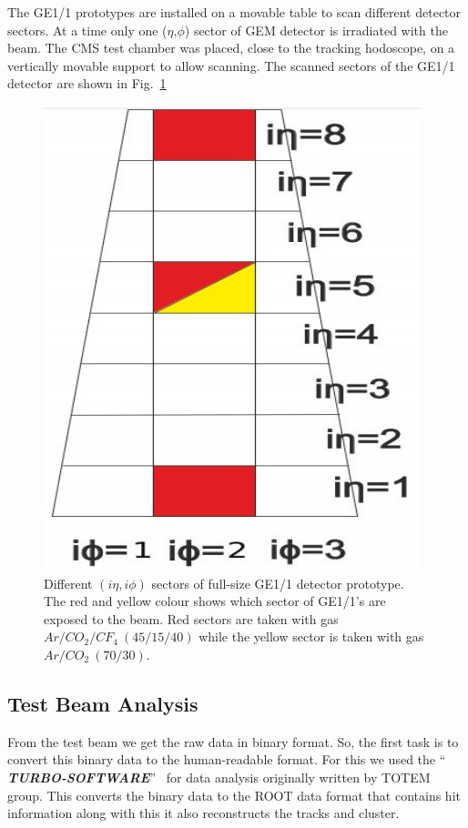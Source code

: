 The GE1/1 prototypes are installed on a movable table to scan different detector sectors. At a time only one ($\eta$,$\phi$) sector of GEM detector is irradiated with the beam.
The CMS test chamber was placed, close to the tracking hodoscope, on a vertically movable support to allow scanning.  The scanned sectors of the GE1/1 detector are shown in Fig.~\ref{GE1/1}
\begin{figure}[!htbp]
\centering
\includegraphics[scale=0.5,angle=90]{figures/GEM/GE11.png}
\caption{Different $(i\eta,i\phi)$ sectors of full-size GE1/1 detector prototype. The red and yellow colour shows which sector of GE1/1's are exposed to the beam. Red sectors are taken with gas $Ar/CO_2/CF_4~(45/15/40)$ while the yellow sector is taken with gas $Ar/CO_2~(70/30)$.}
\label{GE1/1}
\end{figure}
\subsection{Test Beam Analysis} %
\label{sub:test_beam_analysis}
From the test beam we get the raw data in binary format. 
So, the first task is to convert this binary data to the human-readable format. 
For this we used the ``\textbf{ \textit{TURBO-SOFTWARE}}''~\cite{git-trubosoftware} for data analysis originally written by TOTEM group. 
This converts the binary data to the ROOT data format that contains hit information along with this it also reconstructs the tracks and cluster.

